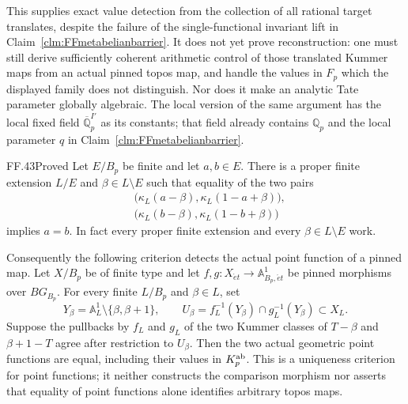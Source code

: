 This supplies exact value detection
from the collection of all rational
target translates, despite the
failure of the single-functional
invariant lift in
Claim~\ref{clm:FFmetabelianbarrier}.
It does not yet prove reconstruction:
one must still derive sufficiently
coherent arithmetic control of those
translated Kummer maps from an
actual pinned topos map, and handle
the values in \(F_p\) which the
displayed family does not distinguish.
Nor does it make an analytic Tate
parameter globally algebraic. The
local version of the same argument
has the local fixed field
\(\overline{\mathbb Q}_p^{I'}\)
as its constants; that field already
contains \(\mathbb Q_p\) and the
local parameter \(q\) in
Claim~\ref{clm:FFmetabelianbarrier}.


\begin{claim}{FF.43}{Proved}\label{clm:FFmetabelianpointdetection}
Let \(E/B_p\) be finite and let
\(a,b\in E\). There is a proper
finite extension \(L/E\) and
\(\beta\in L\setminus E\) such
that equality of the two pairs
\[
 \begin{split}
 &\bigl(\kappa_L(a-\beta),
                  \kappa_L(1-a+\beta)\bigr),\\
 &\bigl(\kappa_L(b-\beta),
                  \kappa_L(1-b+\beta)\bigr)
 \end{split}
                                                        \tag{FF.43.1}
\]
implies \(a=b\). In fact every
proper finite extension and every
\(\beta\in L\setminus E\) work.

Consequently the following criterion
detects the actual point function of
a pinned map. Let \(X/B_p\) be
of finite type and let
\(f,g:X_{\acute et}\to\mathbb A^1_{B_p,\acute et}\)
be pinned morphisms over \(BG_{B_p}\).
For every finite \(L/B_p\) and
\(\beta\in L\), set
\[
 Y_\beta=\mathbb A^1_L\setminus\{\beta,\beta+1\},
 \qquad
 U_\beta=f_L^{-1}(Y_\beta)\cap g_L^{-1}(Y_\beta)
                         \subset X_L.
                                                        \tag{FF.43.2}
\]
Suppose the pullbacks by \(f_L\)
and \(g_L\) of the two Kummer
classes of \(T-\beta\) and
\(\beta+1-T\) agree after restriction
to \(U_\beta\). Then the two
actual geometric point functions
are equal, including their values
in \(K_p^{\rm ab}\).
This is a uniqueness criterion for
point functions; it neither constructs
the comparison morphism nor asserts
that equality of point functions
alone identifies arbitrary topos maps.
\end{claim}
